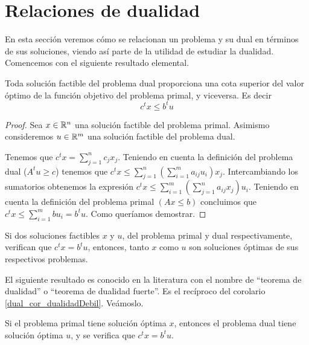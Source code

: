 \section{Relaciones de dualidad}
En esta sección veremos cómo se relacionan un problema y su dual en términos de sus soluciones, viendo así parte de la utilidad de estudiar la dualidad. Comencemos con el siguiente resultado elemental.
\begin{lem}[Cotas]
	\label{dual_lem_cotas}
	Toda solución factible del problema dual proporciona una cota superior del valor óptimo de la función objetivo del problema primal, y viceversa. Es decir
	\begin{equation*}
		c^tx\leq b^tu
	\end{equation*}
\end{lem}
\begin{proof}
	Sea $x\in\mathbb{R}^n$ una solución factible del problema primal. Asimismo consideremos $u\in\mathbb{R}^m$ una solución factible del problema dual.
	
	Tenemos que $c^tx=\sum_{j=1}^nc_jx_j$. Teniendo en cuenta la definición del problema dual ($A^tu\geq c$) tenemos que $c^tx\leq \sum_{j=1}^n(\sum_{i=1}^{m}a_{ij}u_i)x_j$. Intercambiando los sumatorios obtenemos la expresión $c^tx\leq\sum_{i=1}^{m}(\sum_{j=1}^{n}a_{ij}x_j)u_i$. Teniendo en cuenta la definición del problema primal $(Ax\leq b)$ concluimos que $c^tx\leq \sum_{i=1}^{m}bu_i=b^tu$. Como queríamos demostrar.
\end{proof}
\begin{cor}
	\label{dual_cor_dualidadDebil}
	Si dos soluciones factibles $x$ y $u$, del problema primal y dual respectivamente, verifican que $c^tx=b^tu$, entonces, tanto $x$ como $u$ son soluciones óptimas de sus respectivos problemas.
\end{cor}
El siguiente resultado es conocido en la literatura con el nombre de ``teorema de dualidad'' o ``teorema de dualidad fuerte''. Es el recíproco del corolario \ref{dual_cor_dualidadDebil}. Veámoslo.
\begin{theo}
	\label{dual_teo_dualidadFuerte}
	Si el problema primal tiene solución óptima $x$, entonces el problema dual tiene solución óptima $u$, y se verifica que $c^tx=b^tu$.
\end{theo}

